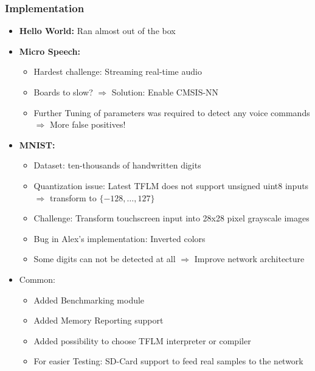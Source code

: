 \documentclass{tum-presentation}
\begin{document}
\begin{frame}
  \frametitle{Implementation}

\begin{itemize}
    \item \textbf{Hello World:} Ran almost out of the box
    \item \textbf{Micro Speech:}
    \begin{itemize}
        \item Hardest challenge: Streaming real-time audio
        \item Boards to slow? $\Rightarrow$ Solution: Enable CMSIS-NN
        \item Further Tuning of parameters was required to detect any voice commands $\Rightarrow$ More false positives!
    \end{itemize}
    \item \textbf{MNIST:}
    \begin{itemize}
        \item Dataset: ten-thousands of handwritten digits
        \item Quantization issue: Latest TFLM does not support unsigned uint8 inputs $\Rightarrow$ transform to $\{-128,\ldots,127\}$
        \item Challenge: Transform touchscreen input into 28x28 pixel grayscale images
        \item Bug in Alex's implementation: Inverted colors
        \item Some digits can not be detected at all $\Rightarrow$ Improve network architecture
    \end{itemize}
    \item Common:
    \begin{itemize}
        \item Added Benchmarking module
        \item Added Memory Reporting support
        \item Added possibility to choose TFLM interpreter or compiler
        \item For easier Testing: SD-Card support to feed real samples to the network
    \end{itemize}
\end{itemize}
\end{frame}
\end{document}
